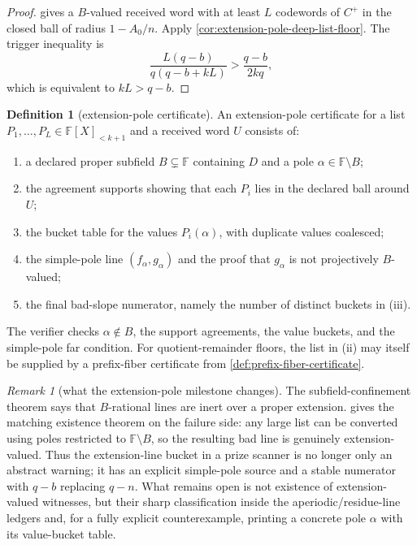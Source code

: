 \documentclass[11pt]{article}
\theoremstyle{definition}
\newtheorem{definition}[theorem]{Definition}
\theoremstyle{remark}
\newtheorem{remark}[theorem]{Remark}
\newcommand{\F}{\mathbb{F}}
\newcommand{\B}{B}
\begin{document}
\begin{proof}
 gives a $\B$-valued received word with
at least $L$ codewords of $C^+$ in the closed ball of radius $1-A_0/n$.  Apply
\cref{cor:extension-pole-deep-list-floor}.  The trigger inequality is
\[
        \frac{L(q-b)}{q(q-b+kL)}>
        \frac{q-b}{2kq},
\]
which is equivalent to $kL>q-b$.
\end{proof}

\begin{definition}[extension-pole certificate]
\label{def:extension-pole-certificate}
An extension-pole certificate for a list $P_1,\ldots,P_L\in\F[X]_{<k+1}$ and a
received word $U$ consists of:
\begin{enumerate}[label=\textup{(\roman*)},leftmargin=2.2em]
\item a declared proper subfield $\B\subsetneq\F$ containing $D$ and a pole
$\alpha\in\F\setminus\B$;
\item the agreement supports showing that each $P_i$ lies in the declared ball
around $U$;
\item the bucket table for the values $P_i(\alpha)$, with duplicate values
coalesced;
\item the simple-pole line $(f_\alpha,g_\alpha)$ and the proof that
$g_\alpha$ is not projectively $\B$-valued;
\item the final bad-slope numerator, namely the number of distinct buckets in
\textup{(iii)}.
\end{enumerate}
The verifier checks $\alpha\notin\B$, the support agreements, the value buckets,
and the simple-pole far condition.  For quotient-remainder floors, the list in
\textup{(ii)} may itself be supplied by a prefix-fiber certificate from
\cref{def:prefix-fiber-certificate}.
\end{definition}

\begin{remark}[what the extension-pole milestone changes]
\label{rem:milestone3-extension-status}
The subfield-confinement theorem says that $\B$-rational lines are inert over a
proper extension.   gives the matching
existence theorem on the failure side: any large list can be converted using
poles restricted to $\F\setminus\B$, so the resulting bad line is genuinely
extension-valued.  Thus the extension-line bucket in a prize scanner is no
longer only an abstract warning; it has an explicit simple-pole source and a
stable numerator with $q-b$ replacing $q-n$.  What remains open is not existence
of extension-valued witnesses, but their sharp classification inside the
aperiodic/residue-line ledgers and, for a fully explicit counterexample, printing
a concrete pole $\alpha$ with its value-bucket table.
\end{remark}
\end{document}
